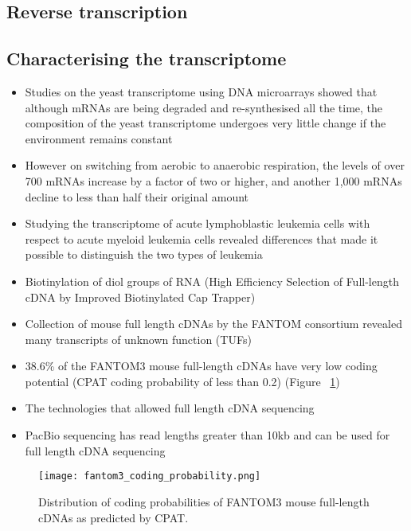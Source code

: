 \subsection{Reverse transcription}

\subsection{Characterising the transcriptome}

\begin{itemize}

   \item Studies on the yeast transcriptome using DNA microarrays showed that although mRNAs are being degraded and re-synthesised all the time, the composition of the yeast transcriptome undergoes very little change if the environment remains constant
   \item However on switching from aerobic to anaerobic respiration, the levels of over 700 mRNAs increase by a factor of two or higher, and another 1,000 mRNAs decline to less than half their original amount
   \item Studying the transcriptome of acute lymphoblastic leukemia cells with respect to acute myeloid leukemia cells revealed differences that made it possible to distinguish the two types of leukemia
   \item Biotinylation of diol groups of RNA (High Efficiency Selection of Full-length cDNA by Improved Biotinylated Cap Trapper) \cite{pmid8938445}
   \item Collection of mouse full length cDNAs by the FANTOM consortium revealed many transcripts of unknown function (TUFs)
   \item 38.6\% of the FANTOM3 mouse full-length cDNAs have very low coding potential (CPAT coding probability of less than 0.2) (Figure ~\ref{fig:fantom3_coding_prob})
   \item The technologies that allowed full length cDNA sequencing
   \item PacBio sequencing has read lengths greater than 10kb and can be used for full length cDNA sequencing

\end{itemize}

\begin{figure}[h]
   \centering
   \texttt{[image: fantom3\_coding\_probability.png]}
   \caption[Coding probability of FANTOM3 mouse cDNAs]{Distribution of coding probabilities of FANTOM3 mouse full-length cDNAs as predicted by CPAT\cite{tang2014fantom3codingprob}.}
   \label{fig:fantom3_coding_prob}
\end{figure}

